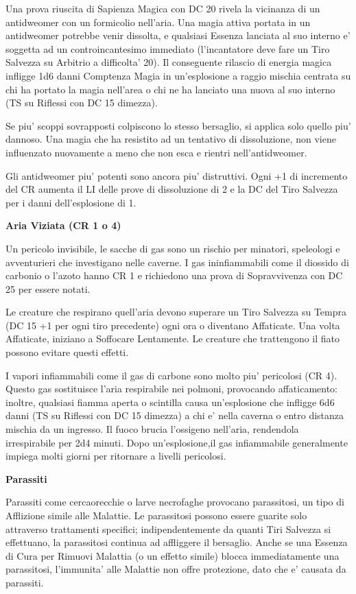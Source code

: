 \documentclass[a4paper,11pt,twoside,openany]{book}
\begin{document}
Una prova riuscita di Sapienza Magica con DC 20 rivela la vicinanza di un antidweomer con un formicolio nell'aria. Una magia attiva portata in un antidweomer potrebbe venir dissolta, e qualsiasi Essenza lanciata al suo interno e' soggetta ad un controincantesimo immediato (l'incantatore deve fare un Tiro Salvezza su Arbitrio a difficolta' 20). Il conseguente rilascio di energia magica infligge 1d6 danni Comptenza Magia in un'esplosione a raggio mischia centrata su chi ha portato la magia nell'area o chi ne ha lanciato una nuova al suo interno (TS su Riflessi con DC 15 dimezza).

Se piu' scoppi sovrapposti colpiscono lo stesso bersaglio, si applica solo quello piu' dannoso. Una magia che ha resistito ad un tentativo di dissoluzione, non viene influenzato nuovamente a meno che non esca e rientri nell'antidweomer.

Gli antidweomer piu' potenti sono ancora piu' distruttivi. Ogni +1 di incremento del CR aumenta il LI delle prove di dissoluzione di 2 e la DC del Tiro Salvezza per i danni dell'esplosione di 1.

\textbf{Aria Viziata (CR 1 o 4)}

Un pericolo invisibile, le sacche di gas sono un rischio per minatori, speleologi e avventurieri che investigano nelle caverne. I gas ininfiammabili come il diossido di carbonio o l'azoto hanno CR 1 e richiedono una prova di Sopravvivenza con DC 25 per essere notati. 

Le creature che respirano quell'aria devono superare un Tiro Salvezza su Tempra (DC 15 +1 per ogni tiro precedente) ogni ora o diventano Affaticate. Una volta Affaticate, iniziano a Soffocare Lentamente. Le creature che trattengono il fiato possono evitare questi effetti.

I vapori infiammabili come il gas di carbone sono molto piu' pericolosi (CR 4). Questo gas sostituisce l'aria respirabile nei polmoni, provocando affaticamento: inoltre, qualsiasi fiamma aperta o scintilla causa un'esplosione che infligge 6d6 danni (TS su Riflessi con DC 15 dimezza) a chi e' nella caverna o entro distanza mischia da un ingresso. Il fuoco brucia l'ossigeno nell'aria, rendendola irrespirabile per 2d4 minuti. Dopo un'esplosione,il gas infiammabile generalmente impiega molti giorni per ritornare a livelli pericolosi.

\textbf{Parassiti}

Parassiti come cercaorecchie o larve necrofaghe provocano parassitosi, un tipo di Afflizione simile alle Malattie. Le parassitosi possono essere guarite solo attraverso trattamenti specifici; indipendentemente da quanti Tiri Salvezza si effettuano, la parassitosi continua ad affliggere il bersaglio. Anche se una Essenza di Cura per Rimuovi Malattia (o un effetto simile) blocca immediatamente una parassitosi, l'immunita' alle Malattie non offre protezione, dato che e' causata da parassiti.
\end{document}

